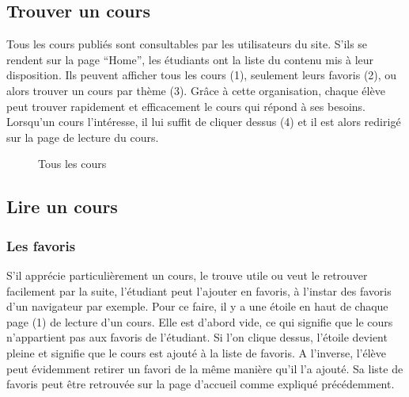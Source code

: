 \documentclass[a4paper,10pt,twoside]{sphinxmanual}
\begin{document}
\subsection{Trouver un cours}
\label{functionalities:trouver-un-cours}
Tous les cours publiés sont consultables par les utilisateurs du site. S'ils se rendent sur la page ``Home'', les étudiants ont la liste du contenu mis à leur disposition. Ils peuvent afficher tous les cours (1), seulement leurs favoris (2), ou alors trouver un cours par thème (3). Grâce à cette organisation, chaque élève peut trouver rapidement et efficacement le cours qui répond à ses besoins. Lorsqu'un cours l'intéresse, il lui suffit de cliquer dessus (4) et il est alors redirigé sur la page de lecture du cours.
\begin{figure}[htbp]
\centering
\capstart

\caption{Tous les cours}\end{figure}


\subsection{Lire un cours}
\label{functionalities:lire-un-cours}

\subsubsection{Les favoris}
\label{functionalities:les-favoris}
S'il apprécie particulièrement un cours, le trouve utile ou veut le retrouver facilement par la suite, l'étudiant peut l'ajouter en favoris, à l'instar des favoris d'un navigateur par exemple. Pour ce faire, il y a une étoile en haut de chaque page (1) de lecture d'un cours. Elle est d'abord vide, ce qui signifie que le cours n'appartient pas aux favoris de l'étudiant. Si l'on clique dessus, l'étoile devient pleine et signifie que le cours est ajouté à la liste de favoris. A l'inverse, l'élève peut évidemment retirer un favori de la même manière qu'il l'a ajouté. Sa liste de favoris peut être retrouvée sur la page d'accueil comme expliqué précédemment.
\end{document}
